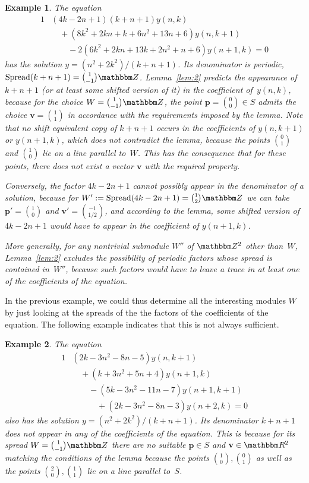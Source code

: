 \documentclass[a4paper]{sig-alternate}
\let\set\mathbbm
\def\vec#1{\mathbf{#1}}
\def\spread{\operatorname{Spread}}
\newtheorem{example}{Example}
\begin{document}
\begin{example}\label{ex:1}
  The equation
  \begin{alignat*}1
    &(4 k-2 n+1) (k+n+1) y(n,k)\\
    &\quad+(8 k^2+2 k n+k+6 n^2+13 n+6) y(n,k+1)\\
    &\qquad-2 (6 k^2+2 k n+13 k+2 n^2+n+6) y(n+1,k)=0
  \end{alignat*}
  has the solution $y=(n^2+2k^2)/(k+n+1)$. Its denominator is periodic, $\spread(k+n+1)=\binom{1}{-1}\set Z$.
  Lemma~\ref{lem:2} predicts the appearance of $k+n+1$ (or at least some shifted version of it)
  in the coefficient of~$y(n,k)$, because for the choice $W=\binom{1}{-1}\set Z$, the point
  $\vec p=\binom 00\in S$ admits the choice $\vec v=\binom11$ in accordance with the requirements imposed
  by the lemma. Note that no shift equivalent copy of $k+n+1$ occurs in the coefficients of $y(n,k+1)$
  or $y(n+1,k)$, which does not contradict the lemma, because the points $\binom01$ and $\binom10$ lie on
  a line parallel to~$W$. This has the consequence that for these points, there does not exist
  a vector $\vec v$ with the required property.

  Conversely, the factor $4k-2n+1$ cannot possibly appear in the denominator of a solution,
  because for $W':=\spread(4k-2n+1)=\binom12\set Z$ we can take $\vec p'=\binom10$ and
  $\vec v'=\binom{-1}{1/2}$, and according to the lemma, some shifted version of $4k-2n+1$
  would have to appear in the coefficient of $y(n+1,k)$.

  More generally, for any nontrivial submodule $W''$ of $\set Z^2$ other than~$W$, Lemma~\ref{lem:2}
  excludes the possibility of periodic factors whose spread is contained in~$W''$, because such
  factors would have to leave a trace in at least one of the coefficients of the equation.

  \medskip
  \centerline{}

\end{example}

In the previous example, we could thus determine all the interesting modules $W$ by just looking
at the spreads of the the factors of the coefficients of the equation. The following example
indicates that this is not always sufficient.

\begin{example}\label{ex:2}
  The equation
  \begin{alignat*}1
    &(2 k-3 n^2-8 n-5) y(n,k+1)\\
    &\quad+(k+3 n^2+5 n+4) y(n+1,k)\\
    &\qquad-(5 k-3n^2-11 n-7) y(n+1,k+1)\\
    &\quad\qquad+(2 k-3 n^2-8 n-3) y(n+2,k)=0
  \end{alignat*}
  also has the solution $y=(n^2+2k^2)/(k+n+1)$. Its denominator $k+n+1$ does not appear in
  any of the coefficients of the equation. This is because for its spread $W=\binom{1}{-1}\set Z$
  there are no suitable $\vec p\in S$ and $\vec v\in\set R^2$ matching the conditions of the
  lemma because the points $\binom10,\binom01$ as well as the points $\binom20,\binom11$ lie
  on a line parallel to~$S$.
\end{example}
\end{document}

